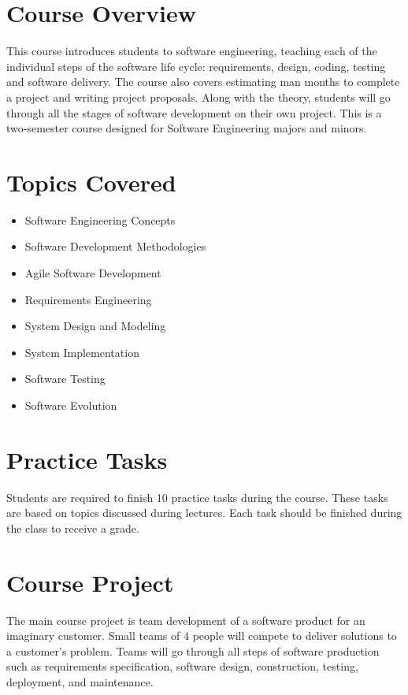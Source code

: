 \documentclass[12pt,a4paper,oneside]{article}
\begin{document}
    \section{Course Overview}

        This course introduces students to software engineering, teaching each of the individual steps of the software life cycle: requirements, design, coding, testing and software delivery. The course also covers estimating man months to complete a project and writing project proposals. Along with the theory, students will go through all the stages of software development on their own project. This is a two-semester course designed for Software Engineering majors and minors.

    \section{Topics Covered}

        \begin{itemize}
            \item Software Engineering Concepts
            \item Software Development Methodologies
            \item Agile Software Development
            \item Requirements Engineering
            \item System Design and Modeling
            \item System Implementation
            \item Software Testing
            \item Software Evolution
        \end{itemize}

    \section{Practice Tasks}

        Students are required to finish 10 practice tasks during the course. These tasks are based on topics discussed during lectures. Each task should be finished during the class to receive a grade.

    \section{Course Project}

        The main course project is team development of a software product for an imaginary customer. Small teams of 4 people will compete to deliver solutions to a customer's problem. Teams will go through all steps of software production such as requirements specification, software design, construction, testing, deployment, and maintenance.
\end{document}
